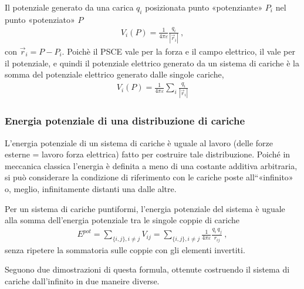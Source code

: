 \documentclass[letterpaper,10pt,italian]{jupyterBook}
\begin{document}
\sphinxAtStartPar
Il potenziale generato da una carica \(q_i\) posizionata punto «potenziante» \(P_i\) nel punto «potenziato» \(P\)
\begin{equation*}
\begin{split}V_i(P) = \frac{1}{4 \pi \varepsilon} \frac{q_i}{|\vec{r}_i|} \ ,\end{split}
\end{equation*}
\sphinxAtStartPar
con \(\vec{r}_i = P - P_i\). Poichè il PSCE vale per la forza e il campo elettrico, il  vale per il potenziale, e quindi il potenziale elettrico generato da un sistema di cariche è la somma del potenziale elettrico generato dalle singole cariche,
\begin{equation*}
\begin{split}V_i(P) = \frac{1}{4 \pi \varepsilon} \sum_i \frac{q_{i}}{\left|\vec{r}_{i}\right|} \end{split}
\end{equation*}

\subsubsection{Energia potenziale di una distribuzione di cariche}
\label{\detokenize{ch/electromagnetism/electrostatics:energia-potenziale-di-una-distribuzione-di-cariche}}
\sphinxAtStartPar
L’energia potenziale di un sistema di cariche è uguale al lavoro (delle forze esterne = \sphinxhyphen{} lavoro forza elettrica) fatto per costruire tale distribuzione. Poiché in meccanica classica l’energia è definita a meno di una costante additiva arbitraria, si può considerare la condizione di riferimento con le cariche poste all“«infinito» o, meglio, infinitamente distanti una dalle altre.

\sphinxAtStartPar
Per un sistema di cariche puntiformi, l’energia potenziale del sistema è uguale alla somma dell’energia potenziale tra le singole coppie di cariche
\begin{equation*}
\begin{split}E^{pot} = \sum_{\{i,j\}, i \ne j} V_{ij} = \sum_{\{i,j\}, i \ne j} \frac{1}{4 \pi \varepsilon} \frac{{q}_{i} \, q_{j}}{r_{ij}} \ ,\end{split}
\end{equation*}
\sphinxAtStartPar
senza ripetere la sommatoria sulle coppie con gli elementi invertiti.

\sphinxAtStartPar
Seguono due dimostrazioni di questa formula, ottenute costruendo il sistema di cariche dall’infinito in due maneire diverse.
\end{document}
